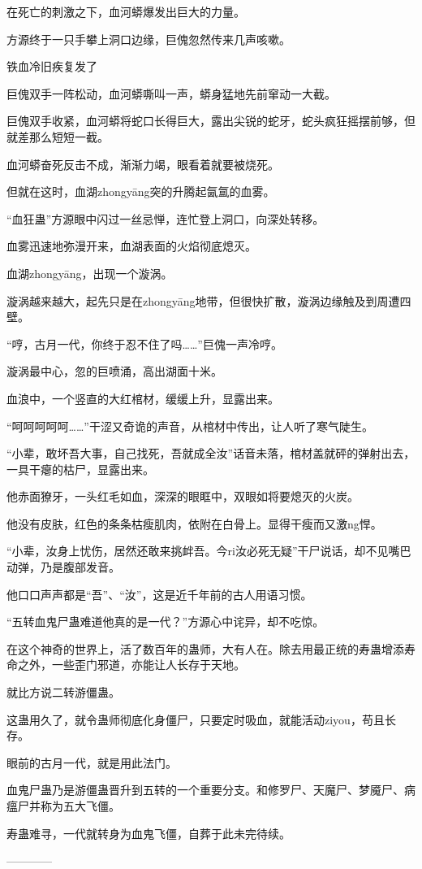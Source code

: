 \begin{this_body}
在死亡的刺激之下，血河蟒爆发出巨大的力量。

方源终于一只手攀上洞口边缘，巨傀忽然传来几声咳嗽。

铁血冷旧疾复发了

巨傀双手一阵松动，血河蟒嘶叫一声，蟒身猛地先前窜动一大截。

巨傀双手收紧，血河蟒将蛇口长得巨大，露出尖锐的蛇牙，蛇头疯狂摇摆前够，但就差那么短短一截。

血河蟒奋死反击不成，渐渐力竭，眼看着就要被烧死。

但就在这时，血湖zhongyāng突的升腾起氤氲的血雾。

“血狂蛊”方源眼中闪过一丝忌惮，连忙登上洞口，向深处转移。

血雾迅速地弥漫开来，血湖表面的火焰彻底熄灭。

血湖zhongyāng，出现一个漩涡。

漩涡越来越大，起先只是在zhongyāng地带，但很快扩散，漩涡边缘触及到周遭四壁。

“哼，古月一代，你终于忍不住了吗……”巨傀一声冷哼。

漩涡最中心，忽的巨喷涌，高出湖面十米。

血浪中，一个竖直的大红棺材，缓缓上升，显露出来。

“呵呵呵呵呵……”干涩又奇诡的声音，从棺材中传出，让人听了寒气陡生。

“小辈，敢坏吾大事，自己找死，吾就成全汝”话音未落，棺材盖就砰的弹射出去，一具干瘪的枯尸，显露出来。

他赤面獠牙，一头红毛如血，深深的眼眶中，双眼如将要熄灭的火炭。

他没有皮肤，红色的条条枯瘦肌肉，依附在白骨上。显得干瘦而又激ng悍。

“小辈，汝身上忧伤，居然还敢来挑衅吾。今ri汝必死无疑”干尸说话，却不见嘴巴动弹，乃是腹部发音。

他口口声声都是“吾”、“汝”，这是近千年前的古人用语习惯。

“五转血鬼尸蛊难道他真的是一代？”方源心中诧异，却不吃惊。

在这个神奇的世界上，活了数百年的蛊师，大有人在。除去用最正统的寿蛊增添寿命之外，一些歪门邪道，亦能让人长存于天地。

就比方说二转游僵蛊。

这蛊用久了，就令蛊师彻底化身僵尸，只要定时吸血，就能活动ziyou，苟且长存。

眼前的古月一代，就是用此法门。

血鬼尸蛊乃是游僵蛊晋升到五转的一个重要分支。和修罗尸、天魔尸、梦魇尸、病瘟尸并称为五大飞僵。

寿蛊难寻，一代就转身为血鬼飞僵，自葬于此未完待续。

------------

\end{this_body}


